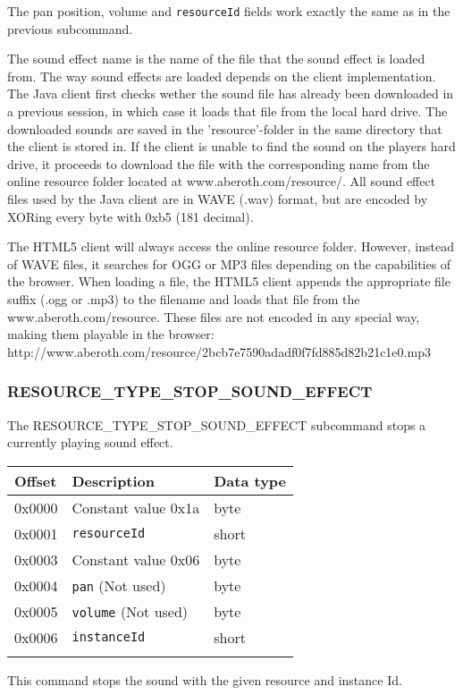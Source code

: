 \documentclass{article}
\newcommand{\field}[1]{\textcolor{fieldColor}{\texttt{#1}}}
\newenvironment{bytelisting}
{\ttfamily \begin{center} \begin{tabular}{l l l} Offset & Description & Data type \\ \hline}
{\normalfont \end{tabular} \end{center}}
\begin{document}
The pan position, volume and \field{resourceId} fields work exactly the same as in the previous subcommand.

The sound effect name is the name of the file that the sound effect is loaded from. The way sound effects are loaded depends on the client implementation. The Java client first checks wether the sound
file has already been downloaded in a previous session, in which case it loads that file from the local hard drive. The downloaded sounds are saved in the 'resource'-folder in the same directory that
the client is stored in. If the client is unable to find the sound on the players hard drive, it proceeds to download the file with the corresponding name from the online resource folder located at
www.aberoth.com/resource/. All sound effect files used by the Java client are in WAVE (.wav) format, but are encoded by XORing every byte with 0xb5 (181 decimal).

The HTML5 client will always access the online resource folder. However, instead of WAVE files, it searches for OGG or MP3 files depending on the capabilities of the browser. When loading a file, the HTML5 client
appends the appropriate file suffix (.ogg or .mp3) to the filename and loads that file from the www.aberoth.com/resource. These files are not encoded in any special way, making them playable in the browser:\\
http://www.aberoth.com/resource/2bcb7e7590adadf0f7fd885d82b21c1e0.mp3

\subsubsection{RESOURCE\_TYPE\_STOP\_SOUND\_EFFECT}
The RESOURCE\_TYPE\_STOP\_SOUND\_EFFECT subcommand stops a currently playing sound effect.

\begin{bytelisting}
0x0000 & Constant value 0x1a & byte \\
0x0001 & \field{resourceId}& short \\
0x0003 & Constant value 0x06 & byte \\
0x0004 & \field{pan} (Not used) & byte \\
0x0005 & \field{volume} (Not used) & byte \\
0x0006 & \field{instanceId} & short \\
\end{bytelisting}

This command stops the sound with the given resource and instance Id.
\end{document}
